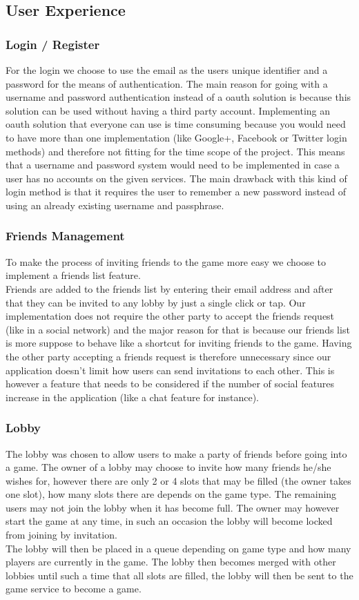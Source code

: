 \subsection{User Experience}
\subsubsection{Login / Register}
For the login we choose to use the email as the users unique identifier and a password for the means of authentication. The main reason for going with a username and password authentication instead of a oauth solution is because this solution can be used without having a third party account. Implementing an oauth solution that everyone can use is time consuming because you would need to have more than one implementation (like Google+, Facebook or Twitter login methods) and therefore not fitting for the time scope of the project. This means that a username and password system would need to be implemented in case a user has no accounts on the given services. The main drawback with this kind of login method is that it requires the user to remember a new password instead of using an already existing username and passphrase. 
\subsubsection{Friends Management}
To make the process of inviting friends to the game more easy we choose to implement a friends list feature.\\ 
Friends are added to the friends list by entering their email address and after that they can be invited to any lobby by just a single click or tap. Our implementation does not require the other party to accept the friends request (like in a social network) and the major reason for that is because our friends list is more suppose to behave like a shortcut for inviting friends to the game. Having the other party accepting a friends request is therefore unnecessary since our application doesn't limit how users can send invitations to each other. This is however a feature that needs to be considered if the number of social features increase in the application (like a chat feature for instance).
\subsubsection{Lobby}
The lobby was chosen to allow users to make a party of friends before going into a game. 
\bigskip
The owner of a lobby may choose to invite how many friends he/she wishes for, however there are only 2 or 4 slots that may be filled (the owner takes one slot), how many slots there are depends on the game type. The remaining users may not join the lobby when it has become full. The owner may however start the game at any time, in such an occasion the lobby will become locked from joining by invitation.\\ 
The lobby will then be placed in a queue depending on game type and how many players are currently in the game. The lobby then becomes merged with other lobbies until such a time that all slots are filled, the lobby will then be sent to the game service to become a game.
